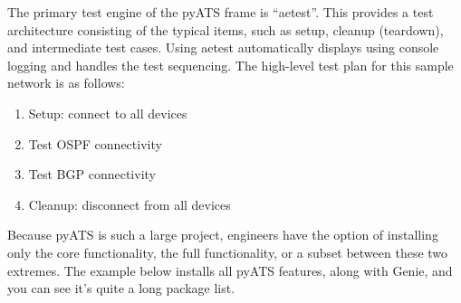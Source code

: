 
The primary test engine of the pyATS frame is ``aetest''. This provides
a test architecture consisting of the typical items, such as setup, cleanup
(teardown), and intermediate test cases. Using aetest automatically displays
using console logging and handles the test sequencing. The high-level test
plan for this sample network is as follows:

\begin{enumerate}
  \item Setup: connect to all devices
  \item Test OSPF connectivity
  \item Test BGP connectivity
  \item Cleanup: disconnect from all devices
\end{enumerate}

Because pyATS is such a large project, engineers have the option of installing
only the core functionality, the full functionality, or a subset between these
two extremes. The example below installs all pyATS features, along with Genie,
and you can see it's quite a long package list.

